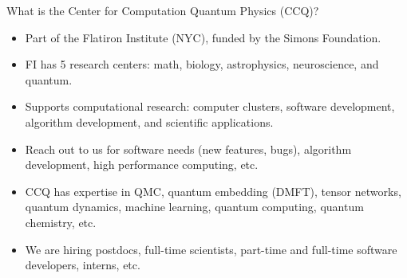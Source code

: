 \begin{frame}{What is the Center for Computation Quantum Physics (CCQ)?}

\begin{itemize}[<+->]

  \item Part of the Flatiron Institute (NYC), funded by the Simons Foundation.
  \item FI has 5 research centers: math, biology, astrophysics, neuroscience, and quantum.
  \item Supports computational research: computer clusters, software development, algorithm development, and scientific applications.
  \item Reach out to us for software needs (new features, bugs), algorithm development, high performance computing, etc.
  \item CCQ has expertise in QMC, quantum embedding (DMFT), tensor networks, quantum dynamics, machine learning, quantum computing, quantum chemistry, etc.
  \item We are hiring postdocs, full-time scientists, part-time and full-time software developers, interns, etc.

\end{itemize}

\end{frame}
